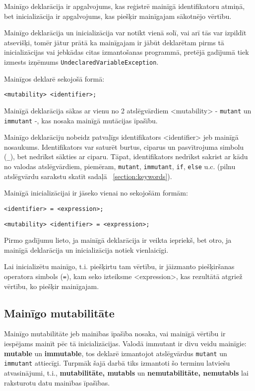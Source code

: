 \documentclass[12pt,a4paper]{report}
\begin{document}
Mainīgo deklarācija ir apgalvojums, kas reģistrē mainīgā identifikatoru atmiņā, bet inicializācija ir apgalvojums, kas piešķir mainīgajam sākotnējo vērtību.

Mainīgo deklarācija un inicializācija var notikt vienā solī, vai arī tās var izpildīt atsevišķi, tomēr jātur prātā ka mainīgajam ir jābūt deklarētam pirms tā inicializācijas vai jebkādas citas izmantošanas programmā, pretējā gadījumā tiek izmests izņēmums \texttt{UndeclaredVariableException}.

Mainīgos deklarē sekojošā formā:
\begin{verbatim}
<mutability> <identifier>;
\end{verbatim}


Mainīgā deklarācija sākas ar vienu no 2 atslēgvārdiem <mutability> - \texttt{mutant} un \texttt{immutant} -, kas nosaka mainīgā mutācijas īpašību. 

Mainīgo deklarāciju nobeidz patvaļīgs identifikators <identifier> jeb mainīgā nosaukums. Identifikators var saturēt burtus, ciparus un pasvītrojuma simbolu (\texttt{\_}), bet nedrīkst sākties ar ciparu. Tāpat, identifikators nedrīkst sakrist ar kādu no valodas atslēgvārdiem, piemēram, \texttt{mutant}, \texttt{immutant}, \texttt{if}, \texttt{else} u.c. (pilnu atslēgvārdu sarakstu skatīt sadaļā ~\ref{section:keywords}).

Mainīgā inicializācijai ir jāseko vienai no sekojošām formām:

\begin{verbatim}
<identifier> = <expression>;
\end{verbatim}  

\begin{verbatim}
<mutability> <identifier> = <expression>;
\end{verbatim}  

Pirmo gadījumu lieto, ja mainīgā deklarācija ir veikta iepriekš, bet otro, ja mainīgā deklarācija un inicializācija notiek vienlaicīgi.

Lai inicializētu mainīgo, t.i. piešķirtu tam vērtību, ir jāizmanto piešķiršanas operatora simbols (\texttt{=}), kam seko izteiksme <expression>, kas rezultātā atgriež vērtību, ko piešķir mainīgajam.

\subsection{Mainīgo mutabilitāte}
\label{section:var-mutability}

Mainīgo mutabilitāte jeb mainības īpašība nosaka, vai mainīgā vērtību ir iespējams mainīt pēc tā inicializācijas. 
Valodā immutant ir divu veidu mainīgie: \textbf{mutable} un \textbf{immutable}, tos deklarē izmantojot atslēgvārdus \texttt{mutant} un \texttt{immutant} attiecīgi. Turpmāk šajā darbā tiks izmantoti šo terminu latviešu atvasinājumi, t.i., \textbf{mutabilitāte, mutabls} un \textbf{nemutabilitāte, nemutabls} lai raksturotu datu mainības īpašības.
\end{document}
